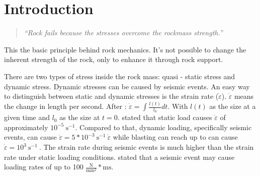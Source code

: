 \chapter{Introduction}

\begin{quote} 
\textit{``Rock fails because the stresses overcome the rockmass strength.''} \\
\autocite[2.13]{canada96}
\end{quote} 
This the basic principle behind rock mechanics. It's not possible to change the inherent strength of the rock, only to enhance it through rock support. \autocite{Hoek80} %




There are two types of stress inside the rock mass: quasi - static stress and dynamic stress.
Dynamic stresses can be caused by seismic events. An easy way to distinguish between static and dynamic stresses is the strain rate  (\( \dot{\varepsilon} \)).  \( \dot{\varepsilon} \) means the change in length per second. After \textcite{strain04}: $\dot{\varepsilon} = \int \frac{l(t)}{l_0} dt  $. With $l(t)$ as the size at a given time and $l_0$ as the size at $t=0$. \textcite[3]{ali2002} stated that static load causes \( \dot{\varepsilon} \) of approximately $ 10^{-5}~\text{s}^{-1} $. 
Compared to that, dynamic loading, specifically seismic events, can cause \(\dot{\varepsilon} = 5 * 10^{-3}~\text{s}^{-1}~ \dot{\varepsilon}\) while blasting can reach up to can cause \(\dot{\varepsilon} = 10^{3}~\text{s}^{-1}~\). The strain rate during seismic events is much higher than the strain rate under static loading conditions. 
\textcite[6]{reinhardt82} stated that a seismic event may cause loading rates of up to 100 \(\frac{\text{N}}{\text{mm}^\text{2}}*\text{ms}\).  %

